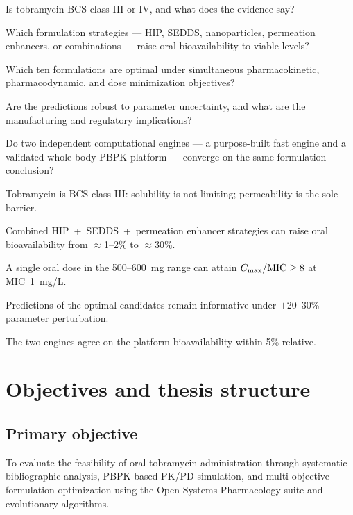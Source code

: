\begin{description}[labelwidth=3.6cm, style=nextline]
\item[RQ1] Is tobramycin BCS class III or IV, and what does the evidence say?
\item[RQ2] Which formulation strategies --- HIP, SEDDS, nanoparticles, permeation enhancers, or combinations --- raise oral bioavailability to viable levels?
\item[RQ3] Which ten formulations are optimal under simultaneous pharmacokinetic, pharmacodynamic, and dose minimization objectives?
\item[RQ4] Are the predictions robust to parameter uncertainty, and what are the manufacturing and regulatory implications?
\item[RQ5] Do two independent computational engines --- a purpose-built fast engine and a validated whole-body PBPK platform --- converge on the same formulation conclusion?
\end{description}

\begin{description}[labelwidth=3.6cm, style=nextline]
\item[H1] Tobramycin is BCS class III: solubility is not limiting; permeability is the sole barrier.
\item[H2] Combined HIP~+~SEDDS~+~permeation enhancer strategies can raise oral bioavailability from $\approx$1--2\% to $\approx$30\%.
\item[H3] A single oral dose in the 500--600~mg range can attain $C_{\max}/\mathrm{MIC} \geq 8$ at MIC~1~mg/L.
\item[H4] Predictions of the optimal candidates remain informative under $\pm$20--30\% parameter perturbation.
\item[H5] The two engines agree on the platform bioavailability within 5\% relative.
\end{description}

\section{Objectives and thesis structure}

\subsection{Primary objective}
To evaluate the feasibility of oral tobramycin administration through systematic bibliographic analysis, PBPK-based PK/PD simulation, and multi-objective formulation optimization using the Open Systems Pharmacology suite and evolutionary algorithms.

